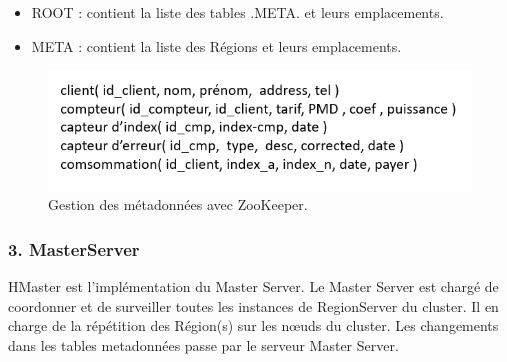 \begin{enumerate}[label=\protect\ding{\value*}, start=182]
\begin{itemize}
\item ROOT : contient la liste des tables .META. et leurs emplacements.
\item META : contient la liste des Régions et leurs emplacements.
\end{itemize}

\begin{figure}[h]
\centering
\includegraphics[scale=0.6]{img/part2/2.6}
\caption{Gestion des métadonnées avec ZooKeeper.}
\end{figure}

\end{enumerate}


\subsubsection*{3. MasterServer}
HMaster est l'implémentation du Master Server. Le Master Server est chargé de coordonner et de surveiller toutes les instances de RegionServer du cluster. Il en charge de la répétition des Région(s) sur les nœuds du cluster. Les changements dans les tables metadonnées passe par le serveur Master Server.

	




























